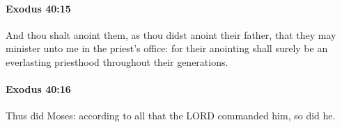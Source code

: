 		\paragraph{Exodus 40:15} %
			\label{EXODUS-40-15}

			And thou shalt anoint them, as thou didst anoint their father, that they may minister unto me in the priest's office: for their anointing shall surely be an everlasting priesthood throughout their generations.


		\paragraph{Exodus 40:16} %
			\label{EXODUS-40-16}

			Thus did Moses: according to all that the LORD commanded him, so did he.


